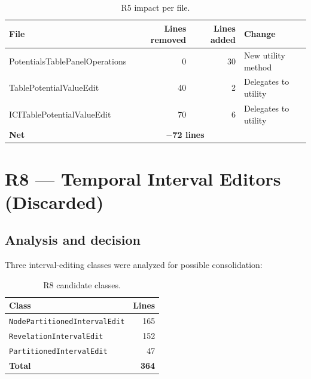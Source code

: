\documentclass[12pt,a4paper]{article}
\newcommand{\cls}[1]{\texttt{#1}}
\begin{document}
\begin{table}[H]
\centering
\small
\begin{tabular}{lrrl}
\toprule
\textbf{File} & \textbf{Lines removed} & \textbf{Lines added} & \textbf{Change} \\
\midrule
PotentialsTablePanelOperations  & 0  & 30 & New utility method \\
TablePotentialValueEdit         & 40 & 2  & Delegates to utility \\
ICITablePotentialValueEdit      & 70 & 6  & Delegates to utility \\
\midrule
\textbf{Net}                    & \multicolumn{2}{c}{\textbf{$-$72 lines}} & \\
\bottomrule
\end{tabular}
\caption{R5 impact per file.}
\label{tab:r5-impact}
\end{table}


\section{R8 --- Temporal Interval Editors (Discarded)}
\label{sec:r8}

\subsection{Analysis and decision}

Three interval-editing classes were analyzed for possible
consolidation:

\begin{table}[H]
\centering
\small
\begin{tabular}{lr}
\toprule
\textbf{Class} & \textbf{Lines} \\
\midrule
\cls{NodePartitionedIntervalEdit}   & 165 \\
\cls{RevelationIntervalEdit}        & 152 \\
\cls{PartitionedIntervalEdit}       & 47  \\
\midrule
\textbf{Total}                      & \textbf{364} \\
\bottomrule
\end{tabular}
\caption{R8 candidate classes.}
\label{tab:r8-classes}
\end{table}
\end{document}
